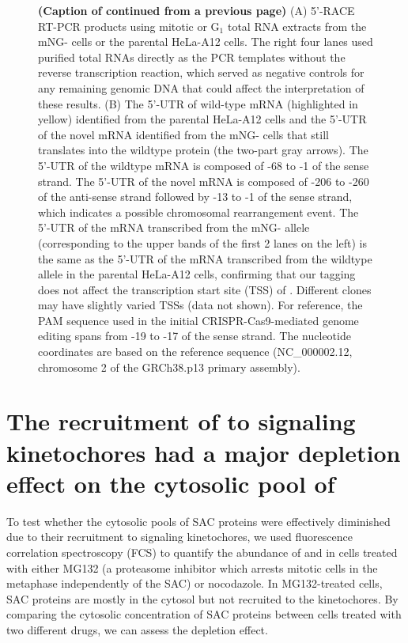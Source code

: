 \begin{figure} [t!]
    \noindent\justifying \textbf{(Caption of  continued from a previous page)} (A) 5'-RACE RT-PCR products using mitotic or G$_1$ total RNA extracts from  the mNG- cells or the parental HeLa-A12 cells. The right four lanes used purified total RNAs directly as the PCR templates without the reverse transcription reaction, which served as negative controls for any remaining genomic DNA that could affect the interpretation of these results. (B) The 5'-UTR of wild-type  mRNA (highlighted in yellow) identified from the parental HeLa-A12 cells and the 5'-UTR of the novel  mRNA identified from the mNG- cells that still translates into the wildtype  protein (the two-part gray arrows). The 5'-UTR of the wildtype  mRNA is composed of -68 to -1 of the sense strand. The 5'-UTR of the novel  mRNA is composed of -206 to -260 of the anti-sense strand followed by -13 to -1 of the sense strand, which indicates a possible chromosomal rearrangement event. The 5'-UTR of the mRNA transcribed from the mNG- allele (corresponding to the upper bands of the first 2 lanes on the left) is the same as the 5'-UTR of the mRNA transcribed from the wildtype  allele in the parental HeLa-A12 cells, confirming that our  tagging does not affect the transcription start site (TSS) of . Different clones may have slightly varied TSSs (data not shown). For reference, the PAM sequence used in the initial CRISPR-Cas9-mediated genome editing spans from -19 to -17 of the sense strand. The nucleotide coordinates are based on the reference sequence (NC\_000002.12, chromosome 2 of the GRCh38.p13 primary assembly).
\end{figure}

\section{The recruitment of  to signaling kinetochores had a major depletion effect on the cytosolic pool of }

To test whether the cytosolic pools of SAC proteins were effectively diminished due to their recruitment to signaling kinetochores, we used fluorescence correlation spectroscopy (FCS) to quantify the abundance of  and  in cells treated with either MG132 (a proteasome inhibitor which arrests mitotic cells in the metaphase independently of the SAC) or nocodazole. In MG132-treated cells, SAC proteins are mostly in the cytosol but not recruited to the kinetochores. By comparing the cytosolic concentration of SAC proteins between cells treated with two different drugs, we can assess the depletion effect.

